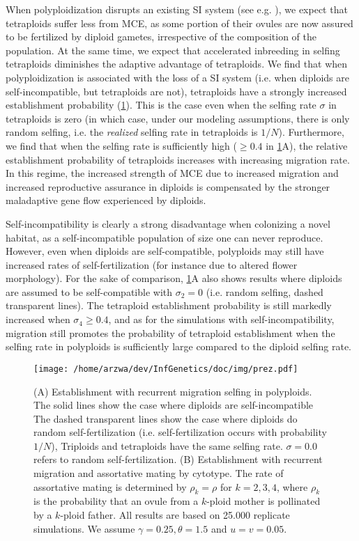 \documentclass[12pt,a4paper]{article}
\begin{document}
When polyploidization disrupts an existing SI system (see e.g.
\cite{robertson2011comparative,zenil2019,novikova2023}), we expect that
tetraploids suffer less from MCE, as some portion of their ovules are now
assured to be fertilized by diploid gametes, irrespective of the composition of
the population.
At the same time, we expect that accelerated inbreeding in selfing tetraploids
diminishes the adaptive advantage of tetraploids.
We find that when polyploidization is associated with the loss of a SI system
(i.e. when diploids are self-incompatible, but tetraploids are not),
tetraploids have a strongly increased establishment probability
(\cref{fig:selfing}).
This is the case even when the selfing rate $\sigma$ in tetraploids is zero (in
which case, under our modeling assumptions, there is only random selfing, i.e.
the \textit{realized} selfing rate in tetraploids is $1/N$).
Furthermore, we find that when the selfing rate is sufficiently high ($\ge 0.4$
in \cref{fig:selfing}A), the relative establishment probability of tetraploids
increases with increasing migration rate.
In this regime, the increased strength of MCE due to increased migration and
increased reproductive assurance in diploids is compensated by the stronger
maladaptive gene flow experienced by diploids.

Self-incompatibility is clearly a strong disadvantage when colonizing a novel
habitat, as a self-incompatible population of size one can never reproduce.
However, even when diploids are self-compatible, polyploids may still have
increased rates of self-fertilization (for instance due to altered flower
morphology).
For the sake of comparison, \cref{fig:selfing}A also shows results where
diploids are assumed to be self-compatible with $\sigma_2=0$ (i.e. random
selfing, dashed transparent lines).
The tetraploid establishment probability is still markedly increased when
$\sigma_4 \ge 0.4$, and as for the simulations with self-incompatibility,
migration still promotes the probability of tetraploid establishment when the
selfing rate in polyploids is sufficiently large compared to the diploid
selfing rate.

\begin{figure}
\centering
\texttt{[image: /home/arzwa/dev/InfGenetics/doc/img/prez.pdf]} 
    \caption{
    (A) Establishment with recurrent migration selfing in polyploids. 
    The solid lines show the case where diploids are self-incompatible 
    The dashed transparent lines show the case where diploids do random
    self-fertilization (i.e. self-fertilization occurs with probability $1/N$),
    Triploids and tetraploids have the same selfing rate. 
    $\sigma=0.0$ refers to random self-fertilization.  
    (B) Establishment with recurrent migration and assortative mating by
    cytotype. The rate of assortative mating is determined by $\rho_k = \rho$
    for $k=2,3,4$, where $\rho_k$ is the probability that an ovule from a
    $k$-ploid mother is pollinated by a $k$-ploid father.
    All results are based on 25.000 replicate simulations.  We assume
    $\gamma=0.25, \theta=1.5$ and $u=v=0.05$.  \label{fig:selfing}}
\end{figure}
\end{document}
